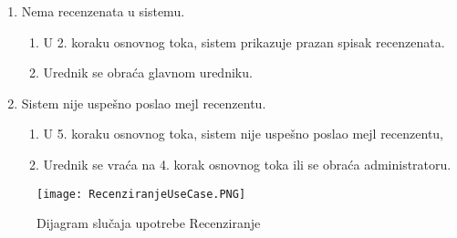 \documentclass[a4paper]{article}
\begin{document}
\begin{itemize}
\begin{enumerate}
            \item Nema recenzenata u sistemu.
            \begin{enumerate}
                \item U 2. koraku osnovnog toka, sistem prikazuje prazan spisak recenzenata.
                \item Urednik se obraća glavnom uredniku.
            \end{enumerate}
            \item Sistem nije uspešno poslao mejl recenzentu.
            \begin{enumerate}
                \item U 5. koraku osnovnog toka, sistem nije uspešno poslao mejl recenzentu,
                \item Urednik se vraća na 4. korak osnovnog toka ili se obraća administratoru.
            \end{enumerate}
        \end{enumerate}
\end{itemize}

\begin{figure}[hbt!]
    \centering
    \texttt{[image: RecenziranjeUseCase.PNG]}
    \caption{Dijagram slučaja upotrebe Recenziranje}
    \label{fig:my_label}
\end{figure}
\end{document}
